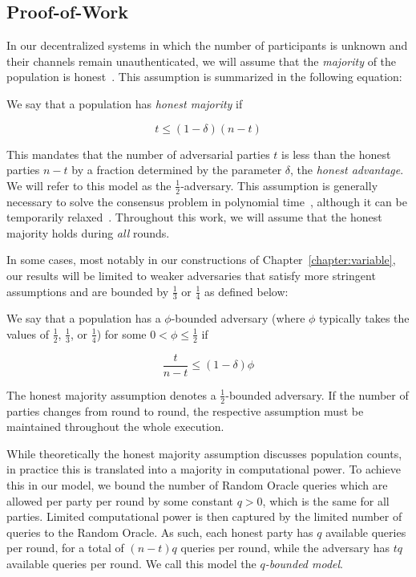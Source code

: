 \subsection{Proof-of-Work}
In our decentralized systems in which the number of participants is unknown and
their channels remain unauthenticated, we will assume that the \emph{majority}
of the population is honest~\cite{backbone}. This assumption is summarized in
the following equation:

\begin{definition}\index{$\delta$}
  We say that a population has \emph{honest majority} if

  \[
  t \leq (1 - \delta)(n - t)
  \]
\end{definition}

This mandates that the number of adversarial parties $t$ is less than the honest
parties $n - t$ by a fraction determined by the parameter $\delta$, the
\emph{honest advantage}. We will refer to
this model as the $\frac{1}{2}$-adversary. This assumption is generally
necessary to solve the consensus problem in polynomial time~\cite{okun},
although it can be temporarily relaxed~\cite{dishonest}. Throughout this
work, we will assume that the honest majority holds during \emph{all} rounds.

In some cases, most notably in our constructions of
Chapter~\ref{chapter:variable}, our results will be limited to weaker
adversaries that satisfy more stringent assumptions and are bounded by
$\frac{1}{3}$ or $\frac{1}{4}$ as defined below:

\begin{definition}
  We say that a population has a $\phi$-bounded adversary (where $\phi$
  typically takes the values of $\frac{1}{2}$, $\frac{1}{3}$, or $\frac{1}{4}$)
  for some $0 < \phi \leq \frac{1}{2}$ if

  \[
  \frac{t}{n - t} \leq (1 - \delta)\phi
  \]
\end{definition}

The honest majority assumption denotes a $\frac{1}{2}$-bounded adversary. If the
number of parties changes from round to round, the respective assumption must be
maintained throughout the whole execution.

While theoretically the honest majority assumption discusses population counts,
in practice this is translated into a majority in computational power. To
achieve this in our model, we bound the number of Random Oracle queries which
are allowed per party per round by some constant $q > 0$, which is the same for all
parties. Limited computational power is then captured by the limited number of
queries to the Random Oracle. As such, each honest party has $q$ available
queries per round, for a total of $(n - t)q$ queries per round, while the
adversary has $tq$ available queries per round. We call this model the
\emph{$q$-bounded model}.

